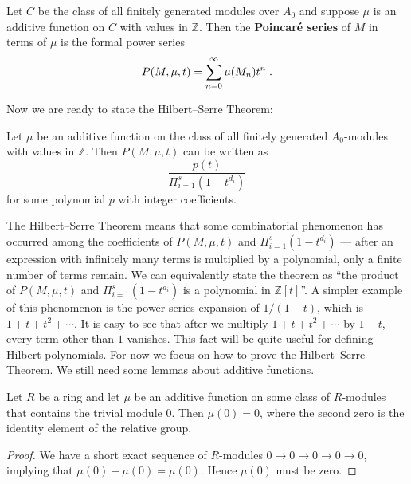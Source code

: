 \begin{definition}
\label{Poincareser}
\leanok
{}
Let $C$ be the class of all finitely generated modules over $A_0$ and suppose $\mu$ is an additive function on $C$ with values in $\mathbb{Z}$. Then the \textbf{Poincar\'e series} of $M$ in terms of $\mu$ is the formal power series
\begin{equation}
P(M,\mu,t)=\sum_{n=0}^{\infty}\mu(M_n)t^n\hspace{1mm}.
\end{equation}
\end{definition}

Now we are ready to state the Hilbert--Serre Theorem:

\begin{theorem}
\label{HilSer}
\leanok
Let $\mu$ be an additive function on the class of all finitely generated $A_0$-modules with values in $\mathbb{Z}$. Then $P(M,\mu,t)$ can be written as
\begin{equation}
\frac{p(t)}{\Pi_{i=1}^s(1-t^{d_i})}
\end{equation}
for some polynomial $p$ with integer coefficients.
\end{theorem}

The Hilbert--Serre Theorem means that some combinatorial phenomenon has occurred among the coefficients of $P(M,\mu,t)$ and $\Pi_{i=1}^s(1-t^{d_i})$ --- after an expression with infinitely many terms is multiplied by a polynomial, only a finite number of terms remain. We can equivalently state the theorem as ``the product of $P(M,\mu,t)$ and $\Pi_{i=1}^s(1-t^{d_i})$ is a polynomial in $\mathbb{Z}[t]$''. A simpler example of this phenomenon is the power series expansion of $1/(1-t)$, which is $1+t+t^2+\cdots$. It is easy to see that after we multiply $1+t+t^2+\cdots$ by $1-t$, every term other than $1$ vanishes. This fact will be quite useful for defining Hilbert polynomials. For now we focus on how to prove the Hilbert--Serre Theorem. We still need some lemmas about additive functions.

\begin{lemma}
\label{additivezero}
\leanok
Let $R$ be a ring and let $\mu$ be an additive function on some class of $R$-modules that contains the trivial module $0$. Then $\mu(0)=0$, where the second zero is the identity element of the relative group.
\end{lemma}
\begin{proof}
We have a short exact sequence of $R$-modules $0\rightarrow{0}\rightarrow{0}\rightarrow{0}\rightarrow{0}$, implying that $\mu(0)+\mu(0)=\mu(0)$. Hence $\mu(0)$ must be zero.
\end{proof}

